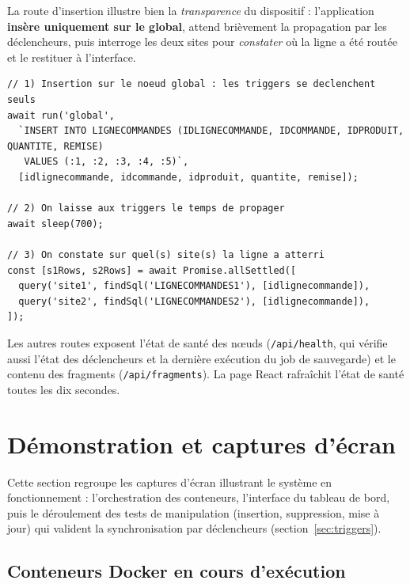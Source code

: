 \documentclass[11pt,a4paper]{article}
\begin{document}
La route d'insertion illustre bien la \emph{transparence} du dispositif :
l'application \textbf{insère uniquement sur le global}, attend brièvement la
propagation par les déclencheurs, puis interroge les deux sites pour
\emph{constater} où la ligne a été routée et le restituer à l'interface.

\begin{lstlisting}[style=ts,caption={Insertion sur le global puis observation du routage (extrait de \texttt{app/api/insert/route.ts}).},label={lst:insert-api}]
// 1) Insertion sur le noeud global : les triggers se declenchent seuls
await run('global',
  `INSERT INTO LIGNECOMMANDES (IDLIGNECOMMANDE, IDCOMMANDE, IDPRODUIT, QUANTITE, REMISE)
   VALUES (:1, :2, :3, :4, :5)`,
  [idlignecommande, idcommande, idproduit, quantite, remise]);

// 2) On laisse aux triggers le temps de propager
await sleep(700);

// 3) On constate sur quel(s) site(s) la ligne a atterri
const [s1Rows, s2Rows] = await Promise.allSettled([
  query('site1', findSql('LIGNECOMMANDES1'), [idlignecommande]),
  query('site2', findSql('LIGNECOMMANDES2'), [idlignecommande]),
]);
\end{lstlisting}

Les autres routes exposent l'état de santé des nœuds (\texttt{/api/health}, qui
vérifie aussi l'état des déclencheurs et la dernière exécution du job de
sauvegarde) et le contenu des fragments (\texttt{/api/fragments}). La page
React rafraîchit l'état de santé toutes les dix secondes.

\section{Démonstration et captures d'écran}
\label{sec:captures}

Cette section regroupe les captures d'écran illustrant le système en
fonctionnement : l'orchestration des conteneurs, l'interface du tableau de bord,
puis le déroulement des tests de manipulation (insertion, suppression, mise à
jour) qui valident la synchronisation par déclencheurs
(section~\ref{sec:triggers}).

\subsection{Conteneurs Docker en cours d'exécution}
\end{document}
